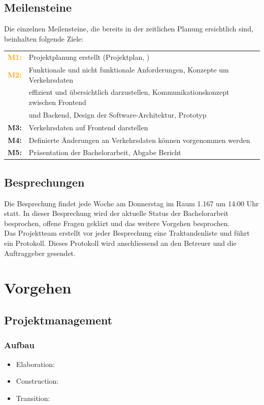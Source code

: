 \documentclass[10pt,a4paper]{article}
\begin{document}
\subsection{Meilensteine}
\begin{flushleft}
	Die einzelnen Meilensteine, die bereits in der zeitlichen Planung ersichtlich sind, beinhalten folgende Ziele:
\end{flushleft}
\begin{tabular}{cl}
	\textcolor{Orange}{\textbf{M1:}} & Projektplanung erstellt (Projektplan, )\\[0.2cm]
	\textcolor{Orange}{\textbf{M2:}} & Funktionale und nicht funktionale Anforderungen, Konzepte um Verkehrsdaten\\[0.1cm]
		& effizient und übersichtlich darzustellen, Kommunikationskonzept zwischen Frontend\\[0.2cm]
		& und Backend, Design der Software-Architektur, Prototyp\\[0.2cm]
	\textcolor{NavyBlue}{\textbf{M3:}} & Verkehrsdaten auf Frontend darstellen\\[0.2cm]
	\textcolor{NavyBlue}{\textbf{M4:}} & Definierte Änderungen an Verkehrsdaten können vorgenommen werden\\[0.2cm]
	\textcolor{Dandelion}{\textbf{M5:}} & Präsentation der Bachelorarbeit, Abgabe Bericht\\
\end{tabular}
\subsection{Besprechungen}
\begin{flushleft}
	Die Besprechung findet jede Woche am Donnerstag im Raum 1.167 um 14:00 Uhr statt. In dieser Besprechung wird der aktuelle Status der Bachelorarbeit besprochen, offene Fragen geklärt und das weitere Vorgehen besprochen.\\
Das Projektteam erstellt vor jeder Besprechung eine Traktandenliste und führt ein Protokoll. Dieses Protokoll wird anschliessend an den Betreuer und die Auftraggeber gesendet.
\end{flushleft}
\newpage
\section{Vorgehen}
\subsection{Projektmanagement}
\subsubsection{Aufbau}
\begin{itemize}
	\item Elaboration: 
	\item Construction: 
	\item Transition: 
\end{itemize}
\end{document}
